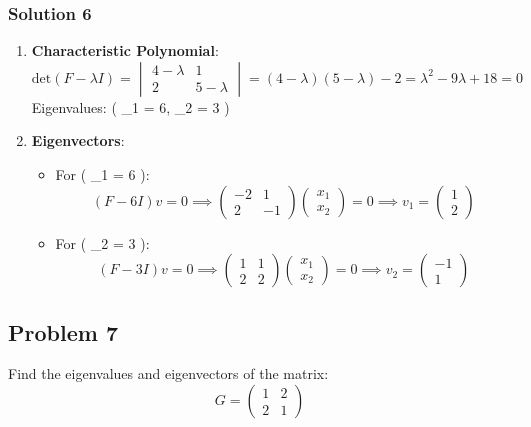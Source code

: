 \documentclass[
  letterpaper,
  DIV=11,
  numbers=noendperiod]{scrartcl}
\providecommand{\tightlist}{%
  \setlength{\itemsep}{0pt}\setlength{\parskip}{0pt}}\usepackage{longtable,booktabs,array}
\begin{document}
\subsubsection{Solution 6}\label{solution-6}

\begin{enumerate}
\def\labelenumi{\arabic{enumi}.}
\item
  \textbf{Characteristic Polynomial}: \[
  \text{det}(F - \lambda I) = \begin{vmatrix} 4 - \lambda & 1 \\ 2 & 5 - \lambda \end{vmatrix} = (4 - \lambda)(5 - \lambda) - 2 = \lambda^2 - 9\lambda + 18 = 0
  \] Eigenvalues: ( \lambda\_1 = 6, \lambda\_2 = 3 )
\item
  \textbf{Eigenvectors}:

  \begin{itemize}
  \tightlist
  \item
    For ( \lambda\_1 = 6 ): \[
    (F - 6I)v = 0 \implies \begin{pmatrix} -2 & 1 \\ 2 & -1 \end{pmatrix}\begin{pmatrix} x_1 \\ x_2 \end{pmatrix} = 0 \implies v_1 = \begin{pmatrix} 1 \\ 2 \end{pmatrix}
    \]
  \item
    For ( \lambda\_2 = 3 ): \[
    (F - 3I)v = 0 \implies \begin{pmatrix} 1 & 1 \\ 2 & 2 \end{pmatrix}\begin{pmatrix} x_1 \\ x_2 \end{pmatrix} = 0 \implies v_2 = \begin{pmatrix} -1 \\ 1 \end{pmatrix}
    \]
  \end{itemize}
\end{enumerate}

\subsection{Problem 7}\label{problem-7}

Find the eigenvalues and eigenvectors of the matrix: \[
G = \begin{pmatrix} 1 & 2 \\ 2 & 1 \end{pmatrix}
\]
\end{document}
